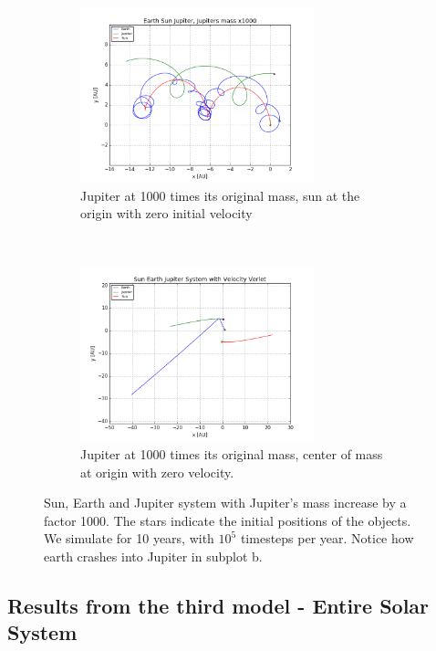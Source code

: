 \documentclass[a4paper, 10pt]{article}
\begin{document}
\begin{figure}[!ht]
    \centering
    \begin{subfigure}[H!]{0.5\textwidth}
        \centering
        \includegraphics[height=2.0in]{orbitESJ1000.png}
        \caption{Jupiter at 1000 times its original mass, sun at the origin with zero initial velocity}
    \end{subfigure}%
    ~ 
    \begin{subfigure}[H!]{0.5\textwidth}
        \centering
        \includegraphics[height=2.0in]{orbitSEJMCAtOri.png}
        \caption{Jupiter at 1000 times its original mass, center of mass at origin with zero velocity.}
    \end{subfigure}
    \caption{Sun, Earth and Jupiter system with Jupiter's mass increase by a factor 1000. The stars indicate the initial positions of the objects. We simulate for 10 years, with $10^5$ timesteps per year. Notice how earth crashes into Jupiter in subplot b.}\label{fig:Jupiter1000}
\end{figure}

\newpage

\subsection{Results from the third model - Entire Solar System}
\end{document}
